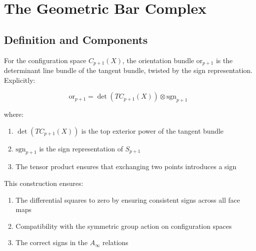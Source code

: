 \section{The Geometric Bar Complex}


 
\subsection{Definition and Components}

\begin{definition}
For the configuration space $C_{p+1}(X)$, the orientation bundle $\text{or}_{p+1}$ is the determinant line bundle of the tangent bundle, twisted by the sign representation. Explicitly:

$$\text{or}_{p+1} = \det(TC_{p+1}(X)) \otimes \text{sgn}_{p+1}$$

where:
\begin{enumerate}
\item $\det(TC_{p+1}(X))$ is the top exterior power of the tangent bundle
\item $\text{sgn}_{p+1}$ is the sign representation of $S_{p+1}$
\item The tensor product ensures that exchanging two points introduces a sign
\end{enumerate}

This construction ensures:
\begin{enumerate}
\item The differential squares to zero by ensuring consistent signs across all face maps
\item Compatibility with the symmetric group action on configuration spaces
\item The correct signs in the $A_\infty$ relations
\end{enumerate}
\end{definition}

